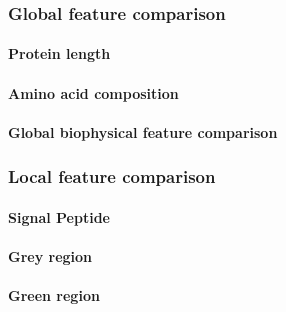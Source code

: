 \documentclass[a4paper]{article}
\begin{document}
		\subsubsection{Global feature comparison}
			
			\paragraph{Protein length}
				
			\paragraph{Amino acid composition}
				
			\paragraph{Global biophysical feature comparison}
				
		\subsubsection{Local feature comparison}
			
			
			
			\paragraph{Signal Peptide}
				
			\paragraph{Grey region}
				
			\paragraph{Green region}
				
\end{document}
